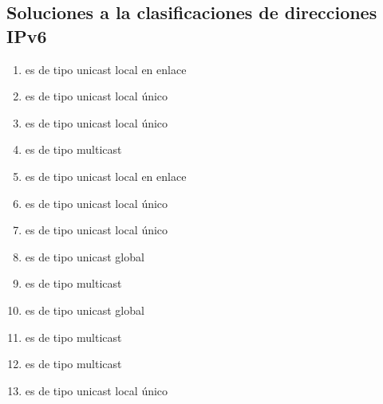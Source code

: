 \documentclass[letterpaper,10pt,spanish]{sphinxmanual}
\begin{document}
\subsection{Soluciones a la clasificaciones de direcciones IPv6}
\label{\detokenize{t2_integracion_elementos/apuntes_t2:soluciones-a-la-clasificaciones-de-direcciones-ipv6}}\begin{enumerate}
%
\item {} 
 es de tipo unicast local en enlace

\item {} 
 es de tipo unicast local único

\item {} 
 es de tipo unicast local único

\item {} 
 es de tipo multicast

\item {} 
 es de tipo unicast local en enlace

\item {} 
 es de tipo unicast local único

\item {} 
 es de tipo unicast local único

\item {} 
 es de tipo unicast global

\item {} 
 es de tipo multicast

\item {} 
 es de tipo unicast global

\item {} 
 es de tipo multicast

\item {} 
 es de tipo multicast

\item {} 
 es de tipo unicast local único


\end{enumerate}
\end{document}
